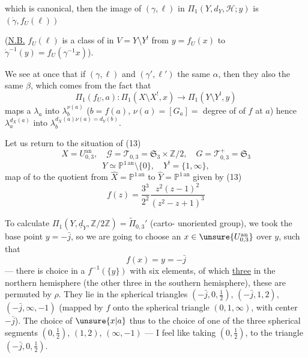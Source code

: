

which is canonical, then the image \inserted{$\beta$} of
$(\gamma,\ell)$ 
in $\Pi_1(Y,d_Y,\mathcal H;y)$ is $(\dot\gamma,f_U(\ell))$

(\uline{N.B.} $f_U(\ell)$ is a class of  in
$V=Y\setminus Y^!$ from $y=f_U(x)$ to
$\dot\gamma^{-1}(y)=f_U(\gamma^{-1}x)$).

 We see at once that if
$(\gamma,\ell)$ and $(\gamma',\ell')$  the
same $\alpha$, then they also 
the same $\beta$, which comes from the fact that
\[
\Pi_1(f_U,a):\Pi_1(X\setminus X^!,x)
\longrightarrow\Pi_1(Y\setminus Y^!,y)
\]
maps a $\lambda_a$ into  $\lambda_b^{\nu(a)}$
($b=f(a)$, $\nu(a)=[G_a]=$ degree of 
of $f$ at $a$) hence $\lambda_a^{d_X(a)}$ into
$\lambda_b^{d_X(a)\nu(a)=d_Y(b)}$.

Let us return to the situation of (13)
\[
X=U_{0,3}^{\mathrm{an}},\quad
\mathcal G=\mathcal T_{0,3}
=\mathfrak S_3\times\mathbb Z/2,\quad
G=\mathcal T_{0,3}^{+}
=\mathfrak S_3
\]
\[
Y\simeq\mathbb P^{1\,\mathrm{an}}\setminus\{0\},\quad
Y^!=\{1,\infty\},
\]
map of  to the quotient from
$\widehat X=\mathbb P^{1\,\mathrm{an}}$ to
$\widehat Y=\mathbb P^{1\,\mathrm{an}}$ given by (13)
\[
f(z)=\frac{3^3}{2^2}\frac{z^2(z-1)^2}{(z^2-z+1)^3}
\]


To calculate
$\Pi_1(Y,\underline{d}_Y,\mathbb Z/2\mathbb Z)
=\widetilde\Pi_{0,3}'$
(carto-  unoriented group),
we took the base point $y=-\bar j$, so we are going to choose
an $x\in\unsure{U_{0,3}^{\mathrm{an}}}$ over $y$, such that
\[
f(x)=y=-\bar j
\]
--- there is  
choice in a  $f^{-1}(\{y\})$ with six
elements, of which \uline{three} in the northern hemisphere
(the other three in the southern hemisphere),
these are permuted  by $\rho$.
They lie  in the
spherical triangles $(-\bar j,0,\frac12)$, $(-\bar j,1,2)$,
$(-\bar j,\infty,-1)$ (mapped by $f$
 onto the  spherical triangle $(0,1,\infty)$,
with center $-\bar j$).
The choice of $\unsure{x|a}$ thus 
to the choice of one of the three
spherical segments $(0,\frac12)$, $(1,2)$, $(\infty,-1)$
--- I feel like taking $(0,\frac12)$, 
to the triangle $(-\bar j,0,\frac12)$.

